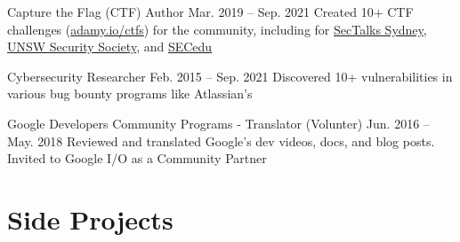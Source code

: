 \documentclass[hidelinks__VERSION__]{adamyi-cv}
\begin{document}
\begin{entrylist}


\entry
{Capture the Flag (CTF) Author}
{Mar. 2019 -- Sep. 2021}
{Created 10+ CTF challenges (\href{https://adamy.io/ctfs}{adamy.io/ctfs}) for the community, including for \href{https://www.sectalks.org/sydney/}{SecTalks Sydney}, \href{https://unswsecurity.com/}{UNSW Security Society}, and \href{https://sec.edu.au/}{SECedu}}


\entry
{Cybersecurity Researcher}
{Feb. 2015 -- Sep. 2021}
{Discovered 10+ vulnerabilities in various bug bounty programs like Atlassian's}


\entry
{Google Developers Community Programs - Translator (Volunter)}
{Jun. 2016 -- May. 2018}
{Reviewed and translated Google's dev videos, docs, and blog posts. Invited to Google I/O as a Community Partner}

\end{entrylist}


\section{Side Projects}
\end{document}
